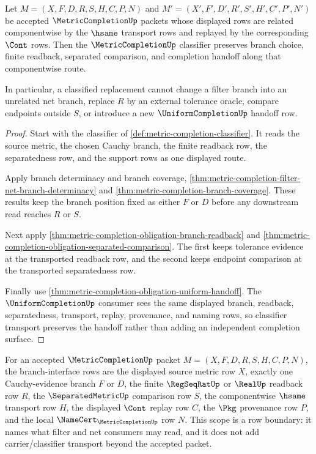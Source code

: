 \begin{theorem}
\label{thm:metric-completion-classifier-stability}
Let $M=(X,F,D,R,S,H,C,P,N)$ and $M'=(X',F',D',R',S',H',C',P',N')$ be accepted $\MetricCompletionUp$ packets whose displayed rows are related componentwise by the $\hsame$ transport rows and replayed by the corresponding $\Cont$ rows. Then the $\MetricCompletionUp$ classifier preserves branch choice, finite readback, separated comparison, and completion handoff along that componentwise route.

In particular, a classified replacement cannot change a filter branch into an unrelated net branch, replace $R$ by an external tolerance oracle, compare endpoints outside $S$, or introduce a new $\UniformCompletionUp$ handoff row.
\end{theorem}
\begin{proof}
Start with the classifier of \autoref{def:metric-completion-classifier}. It reads the source metric, the chosen Cauchy branch, the finite readback row, the separatedness row, and the support rows as one displayed route.

Apply branch determinacy and branch coverage, \autoref{thm:metric-completion-filter-net-branch-determinacy} and \autoref{thm:metric-completion-branch-coverage}. These results keep the branch position fixed as either $F$ or $D$ before any downstream read reaches $R$ or $S$.

Next apply \autoref{thm:metric-completion-obligation-branch-readback} and \autoref{thm:metric-completion-obligation-separated-comparison}. The first keeps tolerance evidence at the transported readback row, and the second keeps endpoint comparison at the transported separatedness row.

Finally use \autoref{thm:metric-completion-obligation-uniform-handoff}. The $\UniformCompletionUp$ consumer sees the same displayed branch, readback, separatedness, transport, replay, provenance, and naming rows, so classifier transport preserves the handoff rather than adding an independent completion surface.
\end{proof}

\begin{definition}
\label{def:metriccompletion-branch-interface-scope}
For an accepted $\MetricCompletionUp$ packet $M=(X,F,D,R,S,H,C,P,N)$, the branch-interface rows are the displayed source metric row $X$, exactly one Cauchy-evidence branch $F$ or $D$, the finite $\RegSeqRatUp$ or $\RealUp$ readback row $R$, the $\SeparatedMetricUp$ comparison row $S$, the componentwise $\hsame$ transport row $H$, the displayed $\Cont$ replay row $C$, the $\Pkg$ provenance row $P$, and the local $\NameCert_{\MetricCompletionUp}$ row $N$. This scope is a row boundary: it names what filter and net consumers may read, and it does not add carrier/classifier transport beyond the accepted packet.
\end{definition}

